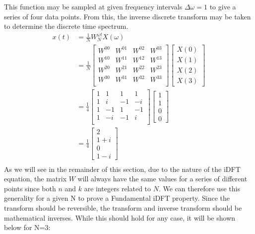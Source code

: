 \documentclass[twocolumn]{article}
\begin{document}
This function may be sampled at given frequency intervals $\Delta \omega = 1$ to give a series of four data points. From this, the inverse discrete transform may be taken to determine the discrete time spectrum. 
\begin{equation}
\begin{split}
x(t) &= \frac{1}{N} W^{\omega t}_N X(\omega) \\
&= \frac{1}{N} \begin{bmatrix}
W^{00} & W^{01} & W^{02} & W^{03} \\
W^{10} & W^{11} & W^{12} & W^{13} \\
W^{20} & W^{21} & W^{22} & W^{23} \\
W^{30} & W^{31} & W^{32} & W^{33} \\
\end{bmatrix} \begin{bmatrix}X(0) \\ X(1) \\ X(2) \\ X(3)\end{bmatrix} \\
&= \frac{1}{4} \begin{bmatrix}
1 & 1 & 1 & 1 \\
1 & i & -1 & -i \\
1 & -1 & 1 & -1 \\
1 & -i & -1 & i \\
\end{bmatrix} \begin{bmatrix}1 \\ 1 \\ 0 \\ 0\end{bmatrix} \\
&= \frac{1}{4} \begin{bmatrix}2 \\ 1+i \\ 0 \\ 1-i\end{bmatrix} \\
\end{split}
\end{equation}
As we will see in the remainder of this section, due to the nature of the iDFT equation, the matrix $W$ will always have the same values for a series of different points since both $n$ and $k$ are integers related to $N$. We can therefore use this generality for a given N to prove a Fundamental iDFT property. Since the transform should be reversible, the transform and inverse transform should be mathematical inverses. While this should hold for any case, it will be shown below for N=3:
\end{document}
